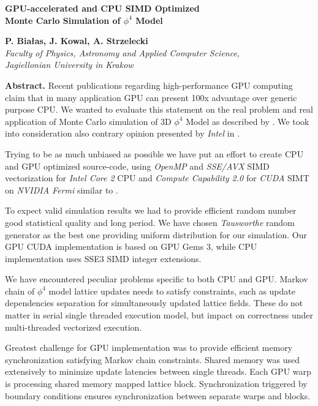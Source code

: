 \documentclass[11pt,a4paper]{article}
\begin{document}
\begin{samepage}
\begin{center}
{\Large{\bf GPU-accelerated and CPU SIMD Optimized \\ Monte Carlo Simulation of $\phi^4$ Model }}

\vspace {5mm}
{\bf P. Białas, J. Kowal, A. Strzelecki}\\
{\em Faculty of Physics, Astronomy and Applied Computer Science, \\ Jagiellonian University in Krakow }\\

\end{center}
\end{samepage}

{\bf Abstract.} Recent publications regarding high-performance GPU computing claim that in many application GPU can present 100x advantage over generic purpose CPU. We wanted to evaluate this statement on the real problem and real application of Monte Carlo simulation of 3D $\phi^4$ Model as described by \cite{PhysRevE.64.066113}. We took into consideration also contrary opinion presented by \emph{Intel} in \cite{Lee:2010:DGV:1816038.1816021}.

Trying to be as much unbiased as possible we have put an effort to create CPU and GPU optimized source-code, using \emph{OpenMP} and \emph{SSE/AVX} SIMD vectorization for \emph{Intel Core 2} CPU and \emph{Compute Capability 2.0} for \emph{CUDA} SIMT on \emph{NVIDIA Fermi} similar to \cite{Preis20094468}.

To expect valid simulation results we had to provide efficient random number good statistical quality and long period. We have chosen \emph{Tausworthe} random generator\cite{LEcuyer96} as the best one providing uniform distribution for our simulation. Our GPU CUDA implementation is based on GPU Gems 3\cite{howes_thomas07}, while CPU implementation uses SSE3 SIMD integer extensions.

We have encountered peculiar problems specific to both CPU and GPU. Markov chain of $\phi^4$ model lattice updates needs to satisfy constraints, such as update dependencies separation for simultaneously updated lattice fields. These do not matter in serial single threaded execution model, but impact on correctness under multi-threaded vectorized execution.

Greatest challenge for GPU implementation was to provide efficient memory synchronization satisfying Markov chain constraints. Shared memory was used extensively to minimize update latencies between single threads. Each GPU warp is processing shared memory mapped lattice block. Synchronization triggered by boundary conditions ensures synchronization between separate warps and blocks.

{}

\end{document}
